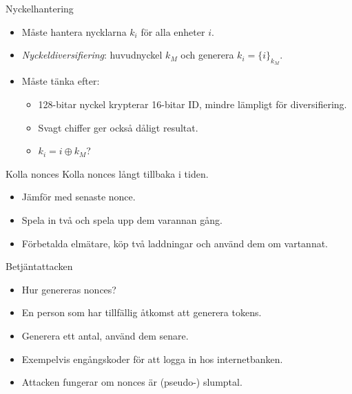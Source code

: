 \documentclass{beamer}
\theoremstyle{definition}
\theoremstyle{remark}
\DeclareMathOperator{\xor}{\oplus}
\newcommand{\encrypt}[2]{\{#1\}_{#2}}
\begin{document}
\begin{frame}{Nyckelhantering}
  \begin{itemize}
    \item Måste hantera nycklarna \(k_i\) för alla enheter \(i\).
    \item \emph{Nyckeldiversifiering}: huvudnyckel \(k_M\) och generera \(k_i 
      = \encrypt{i}{k_M}\).
    \item Måste tänka efter:
      \begin{itemize}
        \item 128-bitar nyckel krypterar 16-bitar ID, mindre lämpligt för 
          diversifiering.
        \item Svagt chiffer ger också dåligt resultat.
        \item \(k_i = i\xor k_M\)?
      \end{itemize}
  \end{itemize}
\end{frame}

\begin{frame}{Kolla nonces}
  Kolla nonces långt tillbaka i tiden.
  \begin{itemize}
    \item Jämför med senaste nonce.
    \item Spela in två och spela upp dem varannan gång.
    \item Förbetalda elmätare, köp två laddningar och använd dem om vartannat.
  \end{itemize}
\end{frame}

\begin{frame}{Betjäntattacken}
  \begin{itemize}
    \item Hur genereras nonces?
    \item En person som har tillfällig åtkomst att generera tokens.
    \item Generera ett antal, använd dem senare.
    \item Exempelvis engångskoder för att logga in hos internetbanken.
    \item Attacken fungerar om nonces är (pseudo-) slumptal.
  \end{itemize}
\end{frame}
\end{document}
